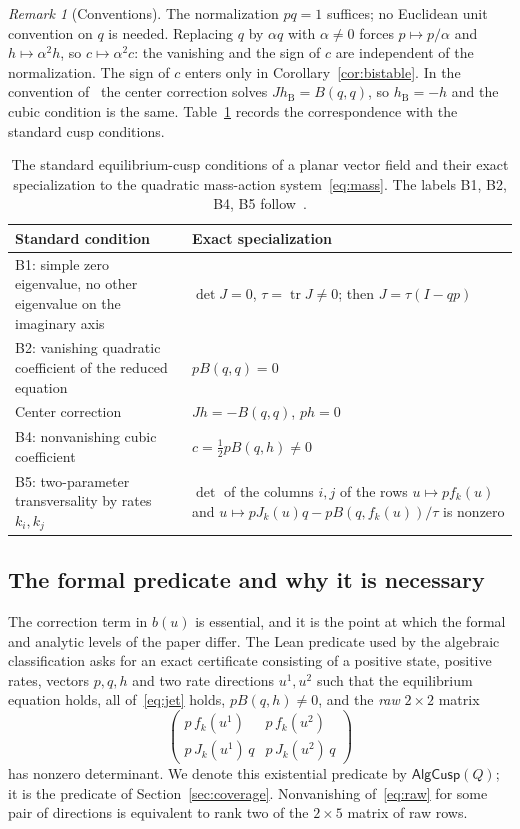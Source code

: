 \documentclass[11pt,a4paper]{article}
\theoremstyle{plain}
\theoremstyle{definition}
\theoremstyle{remark}
\newtheorem{remark}[theorem]{Remark}
\numberwithin{equation}{section}
\newcommand{\tr}{\operatorname{tr}}
\newcommand{\AlgCusp}{\mathsf{AlgCusp}}
\begin{document}
\begin{remark}[Conventions]\label{rem:conventions}
The normalization $pq=1$ suffices; no Euclidean unit convention on $q$ is needed. Replacing $q$ by $\alpha q$ with $\alpha\ne0$ forces $p\mapsto p/\alpha$ and $h\mapsto\alpha^2h$, so $c\mapsto\alpha^2c$: the vanishing and the sign of $c$ are independent of the normalization. The sign of $c$ enters only in Corollary~\ref{cor:bistable}. In the convention of~\citep{B2026} the center correction solves $Jh_{\mathrm B}=B(q,q)$, so $h_{\mathrm B}=-h$ and the cubic condition is the same. Table~\ref{tab:dictionary} records the correspondence with the standard cusp conditions.
\end{remark}

\begin{table}[tb]
\centering\small
\caption{The standard equilibrium-cusp conditions of a planar vector field and their exact specialization to the quadratic mass-action system~\eqref{eq:mass}. The labels B1, B2, B4, B5 follow~\citep{B2026}.}
\label{tab:dictionary}
\begin{tabular}{p{.42\linewidth}p{.50\linewidth}}\toprule
Standard condition & Exact specialization\\\midrule
B1: simple zero eigenvalue, no other eigenvalue on the imaginary axis & $\det J=0$, $\tau=\tr J\ne0$; then $J=\tau(I-qp)$\\
B2: vanishing quadratic coefficient of the reduced equation & $pB(q,q)=0$\\
Center correction & $Jh=-B(q,q)$, $ph=0$\\
B4: nonvanishing cubic coefficient & $c=\tfrac12pB(q,h)\ne0$\\
B5: two-parameter transversality by rates $k_i,k_j$ & $\det$ of the columns $i,j$ of the rows $u\mapsto pf_k(u)$ and $u\mapsto pJ_k(u)q-pB(q,f_k(u))/\tau$ is nonzero\\\bottomrule
\end{tabular}
\end{table}

\subsection{The formal predicate and why it is necessary}
The correction term in $b(u)$ is essential, and it is the point at which the formal and analytic levels of the paper differ. The Lean predicate used by the algebraic classification asks for an exact certificate consisting of a positive state, positive rates, vectors $p,q,h$ and two rate directions $u^1,u^2$ such that the equilibrium equation holds, all of~\eqref{eq:jet} holds, $pB(q,h)\ne0$, and the \emph{raw} $2\times2$ matrix
\begin{equation}\label{eq:raw}
 \begin{pmatrix} p\,f_k(u^1) & p\,f_k(u^2)\\ p\,J_k(u^1)\,q & p\,J_k(u^2)\,q\end{pmatrix}
\end{equation}
has nonzero determinant. We denote this existential predicate by $\AlgCusp(Q)$; it is the predicate  of Section~\ref{sec:coverage}. Nonvanishing of~\eqref{eq:raw} for some pair of directions is equivalent to rank two of the $2\times5$ matrix of raw rows.
\end{document}
